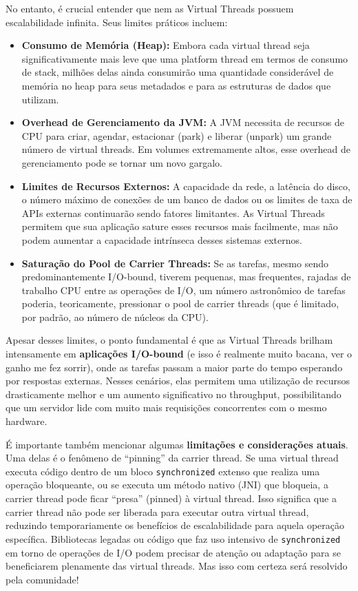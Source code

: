 \documentclass[12pt,a4paper]{article}
\begin{document}
No entanto, é crucial entender que nem as Virtual Threads possuem escalabilidade infinita. Seus limites práticos incluem:
\begin{itemize}
    \item \textbf{Consumo de Memória (Heap):} Embora cada virtual thread seja significativamente mais leve que uma platform thread em termos de consumo de stack, milhões delas ainda consumirão uma quantidade considerável de memória no heap para seus metadados e para as estruturas de dados que utilizam.
    \item \textbf{Overhead de Gerenciamento da JVM:} A JVM necessita de recursos de CPU para criar, agendar, estacionar (park) e liberar (unpark) um grande número de virtual threads. Em volumes extremamente altos, esse overhead de gerenciamento pode se tornar um novo gargalo.
    \item \textbf{Limites de Recursos Externos:} A capacidade da rede, a latência do disco, o número máximo de conexões de um banco de dados ou os limites de taxa de APIs externas continuarão sendo fatores limitantes. As Virtual Threads permitem que sua aplicação sature esses recursos mais facilmente, mas não podem aumentar a capacidade intrínseca desses sistemas externos.
    \item \textbf{Saturação do Pool de Carrier Threads:} Se as tarefas, mesmo sendo predominantemente I/O-bound, tiverem pequenas, mas frequentes, rajadas de trabalho CPU entre as operações de I/O, um número astronômico de tarefas poderia, teoricamente, pressionar o pool de carrier threads (que é limitado, por padrão, ao número de núcleos da CPU).
\end{itemize}

Apesar desses limites, o ponto fundamental é que as Virtual Threads brilham intensamente em \textbf{aplicações I/O-bound} (e isso é realmente muito bacana, ver o ganho me fez sorrir), onde as tarefas passam a maior parte do tempo esperando por respostas externas. Nesses cenários, elas permitem uma utilização de recursos drasticamente melhor e um aumento significativo no throughput, possibilitando que um servidor lide com muito mais requisições concorrentes com o mesmo hardware.

É importante também mencionar algumas \textbf{limitações e considerações atuais}. Uma delas é o fenômeno de ``pinning'' da carrier thread. Se uma virtual thread executa código dentro de um bloco \texttt{synchronized} extenso que realiza uma operação bloqueante, ou se executa um método nativo (JNI) que bloqueia, a carrier thread pode ficar ``presa'' (pinned) à virtual thread. Isso significa que a carrier thread não pode ser liberada para executar outra virtual thread, reduzindo temporariamente os benefícios de escalabilidade para aquela operação específica. Bibliotecas legadas ou código que faz uso intensivo de \texttt{synchronized} em torno de operações de I/O podem precisar de atenção ou adaptação para se beneficiarem plenamente das virtual threads. Mas isso com certeza será resolvido pela comunidade!
\end{document}

